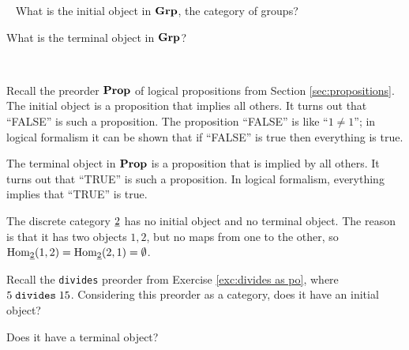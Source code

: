 \documentclass[CT4S-EN-RU]{subfiles}
\begin{document}
\begin{exampleRUS}\label{ex:initial monoid terminal monoid}
\end{exampleRUS}

\begin{exerciseENG}~
\sexc What is the initial object in ${\mathbf{Grp}}$, the category of groups?
\item What is the terminal object in ${\mathbf{Grp}}$?
\endsexc
\end{exerciseENG}

\begin{exerciseRUS}~
\end{exerciseRUS}

\begin{exampleENG}
Recall the preorder ${\mathbf{Prop}}$ of logical propositions from Section \ref{sec:propositions}. The initial object is a proposition that implies all others. It turns out that “FALSE” is such a proposition. The proposition “FALSE” is like “$1\neq1$”; in logical formalism it can be shown that if “FALSE” is true then everything is true.

The terminal object in ${\mathbf{Prop}}$ is a proposition that is implied by all others. It turns out that “TRUE” is such a proposition. In logical formalism, everything implies that “TRUE” is true.
\end{exampleENG}

\begin{exampleRUS}
\end{exampleRUS}

\begin{exampleENG}
The discrete category $\underline{2}$ has no initial object and no terminal object. The reason is that it has two objects $1,2$, but no maps from one to the other, so $\textnormal{Hom}_{\underline{2}}(1,2)=\textnormal{Hom}_{\underline{2}}(2,1)=\emptyset$.
\end{exampleENG}

\begin{exampleRUS}
\end{exampleRUS}

\begin{exerciseENG}
Recall the {\tt divides} preorder from Exercise \ref{exc:divides as po}, where $5\;{\tt divides}\;15$.
\sexc Considering this preorder as a category, does it have an initial object?
\item Does it have a terminal object?
\endsexc
\end{exerciseENG}

\begin{exerciseRUS}
\end{exerciseRUS}
\end{document}
